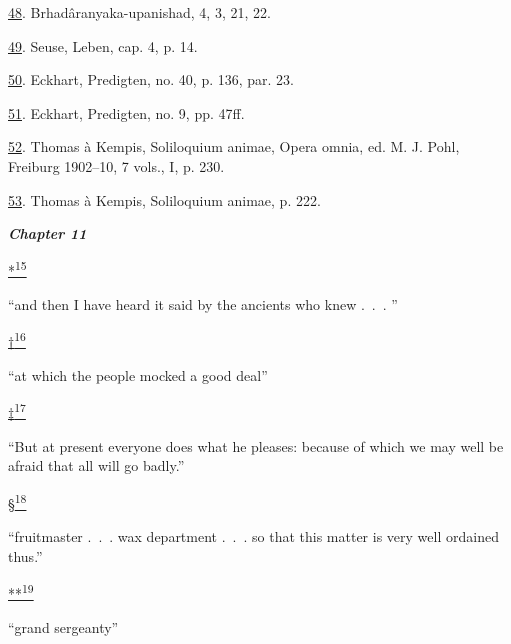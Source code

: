 \protect\hypertarget{23_NOTES.xhtmlux5cux23id_642}{\protect\hyperlink{17_Chapter_Ten__THE_FAILURE_OF_IMAG.xhtmlux5cux23id_641}{48}}.
Brhadâranyaka-upanishad, 4, 3, 21, 22.

\protect\hypertarget{23_NOTES.xhtmlux5cux23id_640}{\protect\hyperlink{17_Chapter_Ten__THE_FAILURE_OF_IMAG.xhtmlux5cux23id_639}{49}}.
Seuse, Leben, cap. 4, p. 14.

\protect\hypertarget{23_NOTES.xhtmlux5cux23id_638}{\protect\hyperlink{17_Chapter_Ten__THE_FAILURE_OF_IMAG.xhtmlux5cux23id_637}{50}}.
Eckhart, Predigten, no. 40, p. 136, par. 23.

\protect\hypertarget{23_NOTES.xhtmlux5cux23id_636}{\protect\hyperlink{17_Chapter_Ten__THE_FAILURE_OF_IMAG.xhtmlux5cux23id_635}{51}}.
Eckhart, Predigten, no. 9, pp. 47ff.

\protect\hypertarget{23_NOTES.xhtmlux5cux23id_634}{\protect\hyperlink{17_Chapter_Ten__THE_FAILURE_OF_IMAG.xhtmlux5cux23id_633}{52}}.
Thomas à Kempis, Soliloquium animae, Opera omnia, ed. M. J. Pohl,
Freiburg 1902--10, 7 vols., I, p. 230.

\protect\hypertarget{23_NOTES.xhtmlux5cux23id_632}{\protect\hyperlink{17_Chapter_Ten__THE_FAILURE_OF_IMAG.xhtmlux5cux23id_631}{53}}.
Thomas à Kempis, Soliloquium animae, p. 222.

\textbf{\emph{Chapter 11}}

\protect\hypertarget{23_NOTES.xhtmlux5cux23id_2334}{\protect\hyperlink{18_Chapter_Eleven__THE_FORMS_OF_THO.xhtmlux5cux23id_2333}{*\textsuperscript{15}}}
``and then I have heard it said by the ancients who knew .~.~. ''

\protect\hypertarget{23_NOTES.xhtmlux5cux23id_2336}{\protect\hyperlink{18_Chapter_Eleven__THE_FORMS_OF_THO.xhtmlux5cux23id_2335}{†\textsuperscript{16}}}
``at which the people mocked a good deal''

\protect\hypertarget{23_NOTES.xhtmlux5cux23id_2338}{\protect\hyperlink{18_Chapter_Eleven__THE_FORMS_OF_THO.xhtmlux5cux23id_2337}{‡\textsuperscript{17}}}
``But at present everyone does what he pleases: because of which we may
well be afraid that all will go badly.''

\protect\hypertarget{23_NOTES.xhtmlux5cux23id_2340}{\protect\hyperlink{18_Chapter_Eleven__THE_FORMS_OF_THO.xhtmlux5cux23id_2339}{§\textsuperscript{18}}}
``fruitmaster .~.~. wax department .~.~. so that this matter is very
well ordained thus.''

\protect\hypertarget{23_NOTES.xhtmlux5cux23id_2342}{\protect\hyperlink{18_Chapter_Eleven__THE_FORMS_OF_THO.xhtmlux5cux23id_2341}{**\textsuperscript{19}}}
``grand sergeanty''

